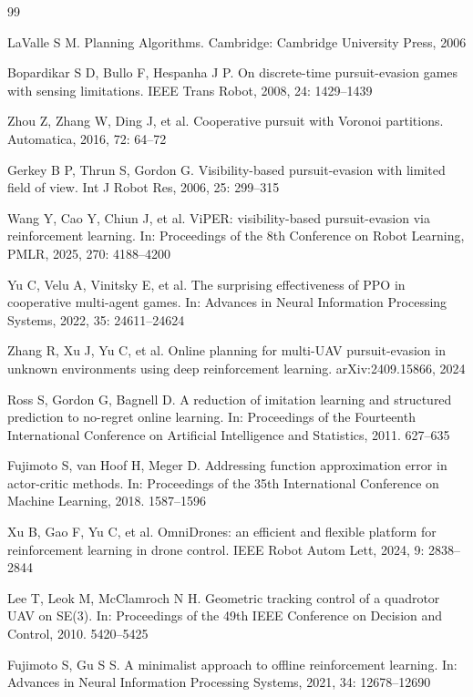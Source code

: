 \documentclass{SCIS2026}
\begin{document}

\begin{thebibliography}{99}

 LaValle S M. Planning Algorithms. Cambridge: Cambridge University Press, 2006

 Bopardikar S D, Bullo F, Hespanha J P. On discrete-time pursuit-evasion games with sensing limitations. IEEE Trans Robot, 2008, 24: 1429--1439

 Zhou Z, Zhang W, Ding J, et al. Cooperative pursuit with Voronoi partitions. Automatica, 2016, 72: 64--72

 Gerkey B P, Thrun S, Gordon G. Visibility-based pursuit-evasion with limited field of view. Int J Robot Res, 2006, 25: 299--315

 Wang Y, Cao Y, Chiun J, et al. ViPER: visibility-based pursuit-evasion via reinforcement learning. In: Proceedings of the 8th Conference on Robot Learning, PMLR, 2025, 270: 4188--4200

 Yu C, Velu A, Vinitsky E, et al. The surprising effectiveness of PPO in cooperative multi-agent games. In: Advances in Neural Information Processing Systems, 2022, 35: 24611--24624

 Zhang R, Xu J, Yu C, et al. Online planning for multi-UAV pursuit-evasion in unknown environments using deep reinforcement learning. arXiv:2409.15866, 2024

 Ross S, Gordon G, Bagnell D. A reduction of imitation learning and structured prediction to no-regret online learning. In: Proceedings of the Fourteenth International Conference on Artificial Intelligence and Statistics, 2011. 627--635

 Fujimoto S, van Hoof H, Meger D. Addressing function approximation error in actor-critic methods. In: Proceedings of the 35th International Conference on Machine Learning, 2018. 1587--1596

 Xu B, Gao F, Yu C, et al. OmniDrones: an efficient and flexible platform for reinforcement learning in drone control. IEEE Robot Autom Lett, 2024, 9: 2838--2844

 Lee T, Leok M, McClamroch N H. Geometric tracking control of a quadrotor UAV on SE(3). In: Proceedings of the 49th IEEE Conference on Decision and Control, 2010. 5420--5425

 Fujimoto S, Gu S S. A minimalist approach to offline reinforcement learning. In: Advances in Neural Information Processing Systems, 2021, 34: 12678--12690

\end{thebibliography}
\end{document}
